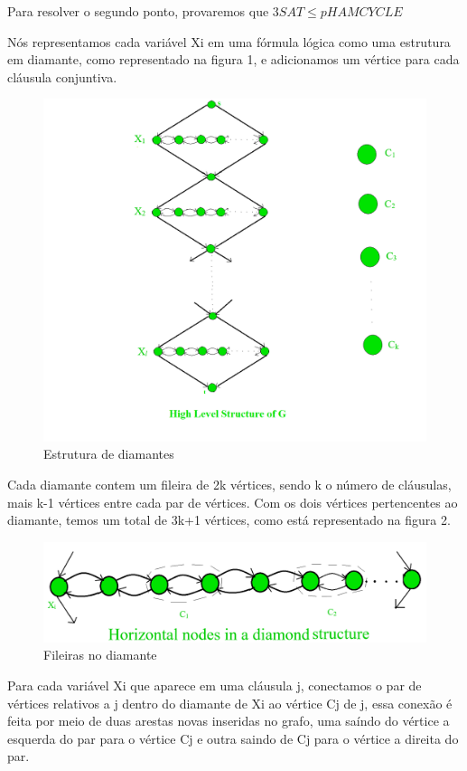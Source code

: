 \documentclass[12pt]{article}
\begin{document}
\begin{enumerate}
{    Para resolver o segundo ponto, provaremos que  \(3SAT \leq p HAMCYCLE\)
    
    Nós representamos cada variável Xi em uma fórmula lógica como uma estrutura em diamante, como representado na figura 1, e adicionamos um vértice para cada cláusula conjuntiva.
    
\begin{figure}[ht]
\centering
\includegraphics[width=.9\textwidth]{Estrutura de diamantes.png}
\caption{Estrutura de diamantes}
\label{fig:}
\end{figure}
    
    Cada diamante contem um fileira de 2k vértices, sendo k o número de cláusulas, mais k-1 vértices entre cada par de vértices. Com os dois vértices pertencentes ao diamante, temos um total de 3k+1 vértices, como está representado na figura 2.
    
\begin{figure}[ht]
\centering
\includegraphics[width=.9\textwidth]{Fileiras no diamante.png}
\caption{Fileiras no diamante}
\label{fig:}
\end{figure}
    
    Para cada variável Xi que aparece em uma cláusula j, conectamos o par de vértices relativos a j dentro do diamante de Xi ao vértice Cj de j, essa conexão é feita por meio de duas arestas novas inseridas no grafo, uma saíndo do vértice a esquerda do par para o vértice Cj e outra saindo de Cj para o vértice a direita do par.
    
}
\end{enumerate}
\end{document}
